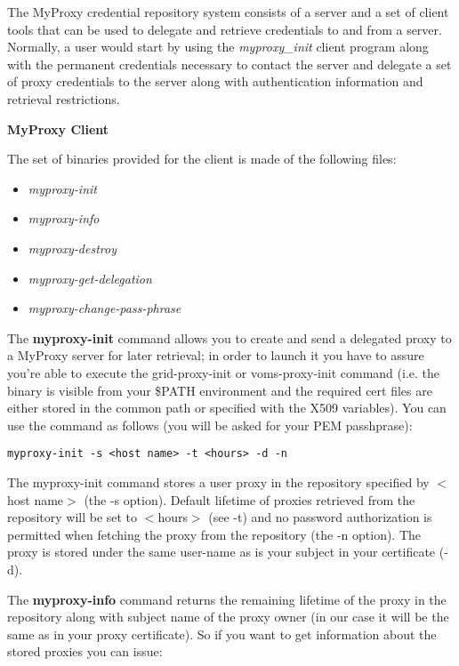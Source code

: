 The MyProxy credential repository system consists of a server and a set of client tools that can be used 
to delegate and retrieve credentials to and from a server. Normally, a user would start by using the 
\textit{myproxy\_init} client program along with the permanent credentials necessary to contact the server 
and delegate a set of proxy credentials to the server along with authentication information and retrieval 
restrictions.

\medskip
\textbf{MyProxy Client}
\medskip

The set of binaries provided for the client is made of the following files:

\begin{itemize}
\item \textit{myproxy-init}
\item \textit{myproxy-info}
\item \textit{myproxy-destroy}
\item \textit{myproxy-get-delegation}
\item \textit{myproxy-change-pass-phrase}
\end{itemize}


The {\bf myproxy-init} command allows you to create and send a delegated proxy to a MyProxy server for 
later retrieval; in order to launch it you have to assure you're able to execute the grid-proxy-init 
or voms-proxy-init command (i.e. the binary is visible from your \$PATH environment and the required 
cert files are either stored in the common path or specified with the X509 variables). You can use the 
command as follows (you will be asked for your PEM passhprase):

\smallskip
{\scriptsize{\verb!myproxy-init -s <host name> -t <hours> -d -n!}}
\smallskip

The myproxy-init command stores a user proxy in the repository specified by $<$host name$>$ (the -s option). 
Default lifetime of proxies retrieved from the repository will be set to $<$hours$>$  (see -t) and no 
password authorization is permitted when fetching the proxy from the repository (the  -n option). 
The proxy is stored under the same user-name as is your subject in your certificate (-d).

\medskip
The {\bf myproxy-info} command returns the remaining lifetime of the proxy in the repository along 
with subject name of the proxy owner (in our case it will be the same as in your proxy certificate). 
So if you want to get information about the stored proxies you can issue:

